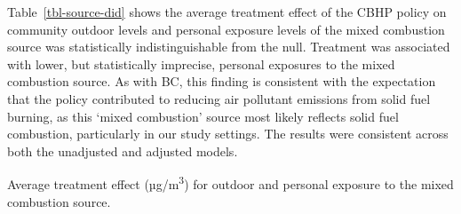 \documentclass[
  letterpaper,
  DIV=11,
  numbers=noendperiod]{scrartcl}
\makeatletter
\renewenvironment{table}%
   {\renewcommand\familydefault\sfdefault
    \@float{table}}
   {\end@float}
\makeatother
\begin{document}
Table~\ref{tbl-source-did} shows the average treatment effect of the
CBHP policy on community outdoor levels and personal exposure levels of
the mixed combustion source was statistically indistinguishable from the
null. Treatment was associated with lower, but statistically imprecise,
personal exposures to the mixed combustion source. As with BC, this
finding is consistent with the expectation that the policy contributed
to reducing air pollutant emissions from solid fuel burning, as this
`mixed combustion' source most likely reflects solid fuel combustion,
particularly in our study settings. The results were consistent across
both the unadjusted and adjusted models.

\begin{table}

\caption{\label{tbl-source-did}Average treatment effect
(µg/m\textsuperscript{3}) for outdoor and personal exposure to the mixed
combustion source.}


\end{table}%
\end{document}
